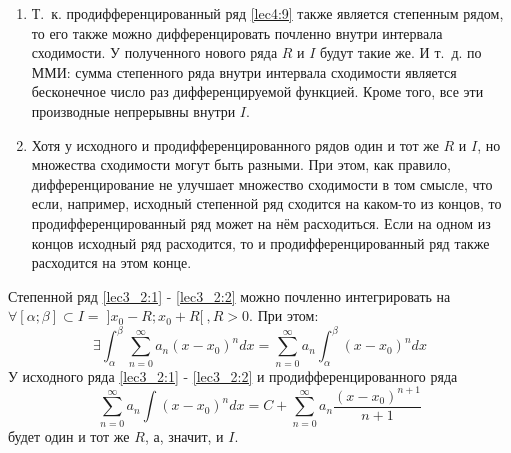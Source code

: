 \documentclass[../../main.tex]{subfiles}
\begin{document}
\begin{rems}
	\;
	
	\begin{enumerate}
		\item Т.~к. продифференцированный ряд \eqref{lec4:9} также 
		является степенным рядом, то его также можно дифференцировать
		почленно внутри интервала сходимости. У полученного нового 
		ряда $R$ и $I$ будут такие же. И т.~д. по ММИ: сумма 
		степенного ряда внутри интервала сходимости является 
		бесконечное число раз дифференцируемой функцией. Кроме 
		того, все эти производные непрерывны внутри $I$.
		
		\item Хотя у исходного и продифференцированного рядов один
		и тот же $R$ и $I$, но множества сходимости могут быть разными.
		При этом, как правило, дифференцирование не улучшает
		множество сходимости в том смысле, что если, например, 
		исходный степенной ряд сходится на каком-то из концов, то
		продифференцированный ряд может на нём расходиться. 
		Если на одном из концов исходный ряд расходится, 
		то и продифференцированный ряд также расходится на этом конце. 
	\end{enumerate}
\end{rems}

\begin{thm}
	Степенной ряд \eqref{lec3_2:1} - \eqref{lec3_2:2} можно почленно 
	интегрировать на $\forall [\alpha; \beta] \subset I = \;
	]x_0 - R;x_0 + R[ \:, R > 0 $. При этом:
	\begin{equation} \label{lec4:11}
		\exists \int_{\alpha}^{\beta} \sum\limits_{n = 0}^{\infty}
		a_n(x - x_0)^n dx = \sum\limits_{n = 0}^{\infty} a_n
		\int_{\alpha}^{\beta} (x - x_0)^n dx
	\end{equation}
	У исходного ряда \eqref{lec3_2:1} - \eqref{lec3_2:2} и продифференцированного
	ряда 
	\begin{equation} \label{lec4:12}
		\sum\limits_{n = 0}^{\infty} a_n \int (x - x_0)^n dx =
		C + \sum\limits_{n = 0}^{\infty} a_n 
		\dfrac{ (x - x_0)^{n + 1} }{n + 1}
	\end{equation}
	будет один и тот же $R$, а, значит, и $I$. 
\end{thm}
\end{document}
